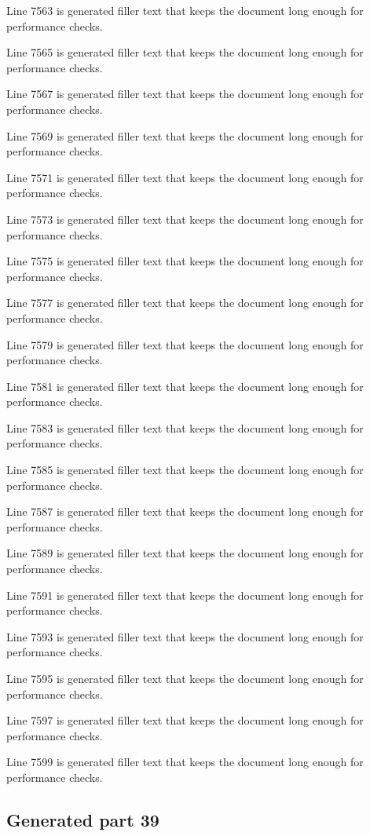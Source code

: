 Line 7563 is generated filler text that keeps the document long enough for performance checks.

Line 7565 is generated filler text that keeps the document long enough for performance checks.

Line 7567 is generated filler text that keeps the document long enough for performance checks.

Line 7569 is generated filler text that keeps the document long enough for performance checks.

Line 7571 is generated filler text that keeps the document long enough for performance checks.

Line 7573 is generated filler text that keeps the document long enough for performance checks.

Line 7575 is generated filler text that keeps the document long enough for performance checks.

Line 7577 is generated filler text that keeps the document long enough for performance checks.

Line 7579 is generated filler text that keeps the document long enough for performance checks.

Line 7581 is generated filler text that keeps the document long enough for performance checks.

Line 7583 is generated filler text that keeps the document long enough for performance checks.

Line 7585 is generated filler text that keeps the document long enough for performance checks.

Line 7587 is generated filler text that keeps the document long enough for performance checks.

Line 7589 is generated filler text that keeps the document long enough for performance checks.

Line 7591 is generated filler text that keeps the document long enough for performance checks.

Line 7593 is generated filler text that keeps the document long enough for performance checks.

Line 7595 is generated filler text that keeps the document long enough for performance checks.

Line 7597 is generated filler text that keeps the document long enough for performance checks.

Line 7599 is generated filler text that keeps the document long enough for performance checks.

\subsection{Generated part 39}

